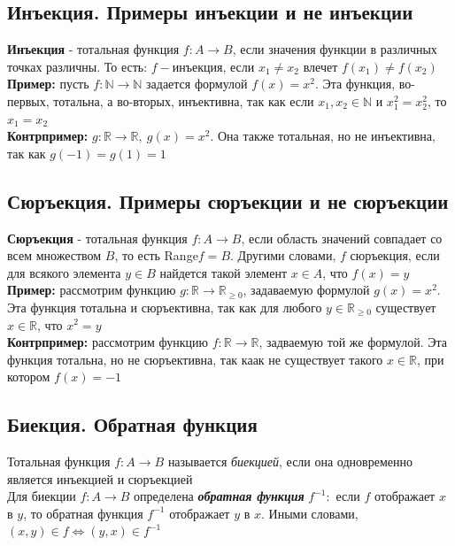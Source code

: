 \documentclass[a4paper]{article}
\begin{document}
\subsection{Инъекция. Примеры инъекции и не инъекции}
\textbf{Инъекция} - тотальная функция $f: A\rightarrow B$, если значения функции в различных точках различны. То есть: $f-$инъекция, если $x_1\ne x_2$ влечет $f(x_1)\ne f(x_2)$\\[2mm]
\indent \textbf{Пример:} пусть $f: \mathbb{N}\rightarrow\mathbb{N}$ задается формулой $f(x)=x^2$. Эта функция, во-первых, тотальна, а во-вторых, инъективна, так как если $x_1, x_2\in \mathbb{N}$ и $x_1^2=x_2^2$, то $x_1=x_2$\\[2mm]
\indent \textbf{Контрпример:} $g: \mathbb{R}\rightarrow\mathbb{R},\ g(x)=x^2$. Она также тотальная, но не инъективна, так как $g(-1)=g(1)=1$
\subsection{Сюръекция. Примеры сюръекции и не сюръекции}
\textbf{Сюръекция} - тотальная функция $f: A\rightarrow B$, если область значений совпадает со всем множеством $B$, то есть Range$f=B$. Другими словами, $f$ сюръекция, если для всякого элемента $y\in B$ найдется такой элемент $x\in A$, что $f(x)=y$\\[2mm]
\indent \textbf{Пример:} рассмотрим функцию $g: \mathbb{R}\rightarrow\mathbb{R}_{\geqslant0}$, задаваемую формулой $g(x)=x^2$. Эта функция тотальна и сюръективна, так как для любого $y\in\mathbb{R}_{\geqslant0}$ существует $x\in\mathbb{R}$, что $x^2=y$\\[2mm]
\indent \textbf{Контрпример:} рассмотрим функцию $f: \mathbb{R}\rightarrow\mathbb{R}$, задваемую той же формулой. Эта функция тотальна, но не сюръективна, так каак не существует такого $x\in \mathbb{R}$, при котором $f(x)=-1$
\subsection{Биекция. Обратная функция}
Тотальная функция $f: A\rightarrow B$ называется \textit{биекцией}, если она одновременно является инъекцией и сюръекцией\\[2mm]
\indent Для биекции $f: A\rightarrow B$ определена \textbf{\textit{обратная функция}} $f^{-1}:$ если $f$ отображает $x$ в $y$, то обратная функция $f^{-1}$ отображает $y$ в $x$. Иными словами, $(x, y)\in f\Leftrightarrow(y, x)\in f^{-1}$\\[2mm]
\end{document}
